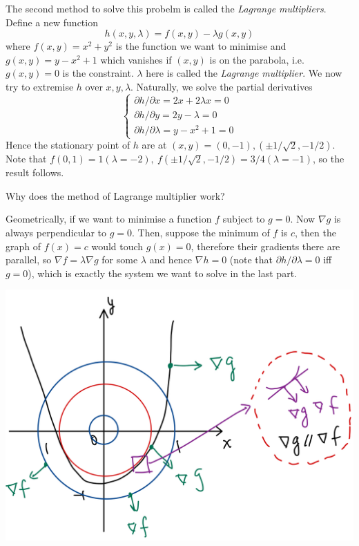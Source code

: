 \documentclass[a4paper]{article}
\begin{document}
\begin{example}
    The second method to solve this probelm is called the \textit{Lagrange multipliers}.
    Define a new function
    $$h(x,y,\lambda)=f(x,y)-\lambda g(x,y)$$
    where $f(x,y)=x^2+y^2$ is the function we want to minimise and $g(x,y)=y-x^2+1$ which vanishes if $(x,y)$ is on the parabola, i.e. $ g(x,y)=0 $ is the constraint.
    $\lambda$ here is called the \textit{Lagrange multiplier}.
    We now try to extremise $h$ over $x,y,\lambda$.
    Naturally, we solve the partial derivatives
    $$\begin{cases}
        \partial h/\partial x=2x+2\lambda x=0\\
        \partial h/\partial y=2y-\lambda=0\\
        \partial h/\partial\lambda=y-x^2+1=0
    \end{cases}$$
    Hence the stationary point of $h$ are at $(x,y)=(0,-1),(\pm 1/\sqrt{2},-1/2)$.
    Note that $ f(0,1)=1(\lambda=-2),\ f(\pm 1/\sqrt{2},-1/2)=3/4(\lambda=-1) $, so the result follows.
\end{example}

Why does the method of Lagrange multiplier work?

Geometrically, if we want to minimise a function $f$ subject to $g=0$.
Now $\nabla g$ is always perpendicular to $g=0$.
Then, suppose the minimum of $f$ is $c$, then the graph of $f(x)=c$ would touch $g(x)=0$, therefore their gradients there are parallel, so $\nabla f=\lambda\nabla g$ for some $\lambda$ and hence $\nabla h=0$ (note that $\partial h/\partial\lambda=0$ iff $g=0$), which is exactly the system we want to solve in the last part.

\begin{center}
    \includegraphics[scale=0.15]{best_fit_circ2.jpeg}
\end{center}
\end{document}
